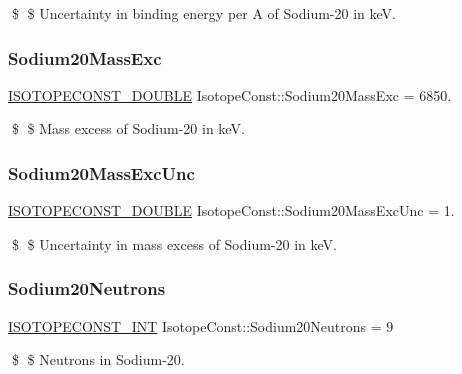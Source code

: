 \$ \$ Uncertainty in binding energy per A of Sodium-\/20 in keV. \mbox{\label{group___isotope_const-_sodium-_na20_ga94b3c7c96bc3bc46f89ce0e5c9261b66}} 
\subsubsection{\texorpdfstring{Sodium20\+Mass\+Exc}{Sodium20MassExc}}
{\footnotesize\ttfamily \mbox{\hyperlink{group___isotope_const-_macros_ga8f45a7272ce02c0b4c65c44636ed719a}{I\+S\+O\+T\+O\+P\+E\+C\+O\+N\+S\+T\+\_\+\+D\+O\+U\+B\+LE}} Isotope\+Const\+::\+Sodium20\+Mass\+Exc = 6850.}

\$ \$ Mass excess of Sodium-\/20 in keV. \mbox{\label{group___isotope_const-_sodium-_na20_ga2cbce6a5142b051b291613db07398d44}} 
\subsubsection{\texorpdfstring{Sodium20\+Mass\+Exc\+Unc}{Sodium20MassExcUnc}}
{\footnotesize\ttfamily \mbox{\hyperlink{group___isotope_const-_macros_ga8f45a7272ce02c0b4c65c44636ed719a}{I\+S\+O\+T\+O\+P\+E\+C\+O\+N\+S\+T\+\_\+\+D\+O\+U\+B\+LE}} Isotope\+Const\+::\+Sodium20\+Mass\+Exc\+Unc = 1.}

\$ \$ Uncertainty in mass excess of Sodium-\/20 in keV. \mbox{\label{group___isotope_const-_sodium-_na20_ga029602697a52c4b5002a53367e10a328}} 
\subsubsection{\texorpdfstring{Sodium20\+Neutrons}{Sodium20Neutrons}}
{\footnotesize\ttfamily \mbox{\hyperlink{group___isotope_const-_macros_ga5f18360b3e99483a35c32d789e62621c}{I\+S\+O\+T\+O\+P\+E\+C\+O\+N\+S\+T\+\_\+\+I\+NT}} Isotope\+Const\+::\+Sodium20\+Neutrons = 9}

\$ \$ Neutrons in Sodium-\/20. \mbox{\label{group___isotope_const-_sodium-_na20_gae672b08ae1d212f5d08b14a16b7ee3a6}} 
